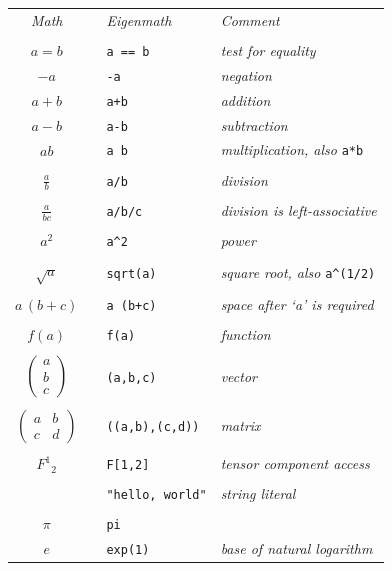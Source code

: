 \documentclass[12pt]{article}
\begin{document}
\begin{center}
\begin{tabular}{clll}
{\it Math} & & {\it Eigenmath} & {\it Comment}
\\
\\
$a=b$ & & \verb$a == b$ & {\it test for equality}
\\[1ex]
$-a$ & & \verb$-a$ & {\it negation}
\\[1ex]
$a+b$ & & \verb$a+b$ & {\it addition}
\\[1ex]
$a-b$ & & \verb$a-b$ & {\it subtraction}
\\[1ex]
$ab$ & & \verb$a b$ & {\it multiplication, also} \verb$a*b$
\\
\\
$\displaystyle\frac{a}{b}$ & & \verb$a/b$ & {\it division}
\\
\\
$\displaystyle\frac{a}{bc}$ & & \verb$a/b/c$ & {\it division is left-associative}
\\
\\
$a^2$ & & \verb$a^2$ & {\it power}
\\
\\
$\sqrt{a}$ & & \verb$sqrt(a)$ & {\it square root, also} \verb$a^(1/2)$
\\
\\
$a\,(b+c)$ & & \verb$a (b+c)$ & {\it space after `a' is required}
\\
\\
$f(a)$ & & \verb$f(a)$ & {\it function}
\\
\\
$\begin{pmatrix}a\\ b\\ c\end{pmatrix}$ & & \verb$(a,b,c)$ & {\it vector}
\\
\\
$\begin{pmatrix}a&b\\ c&d\end{pmatrix}$ & & \verb$((a,b),(c,d))$ & {\it matrix}
\\
\\
$F^1{}_2$ & & \verb$F[1,2]$ & {\it tensor component access}
\\
\\
 & & \verb$"hello, world"$ & {\it string literal}
\\
\\
$\pi$ & & \verb$pi$ &
\\[1ex]
$e$ && \verb$exp(1)$ & {\it base of natural logarithm}
\end{tabular}
\end{center}
\end{document}
